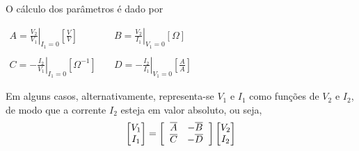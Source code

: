 \documentclass{article}
\numberwithin{equation}{section}
\begin{document}
\noindent O cálculo dos parâmetros é dado por
\begin{center}
    $\begin{matrix} %
            A=\displaystyle\left.\frac{V_{2}}{V_{1}}\right|_{I_{1}=0} \left[\frac{V}{V}\right] &\quad B=\displaystyle\left.\frac{V_{2}}{I_{1}}\right|_{V_{1}=0}[\Omega]\\\\
            C=\displaystyle\left.-\frac{I_{2}}{V_{1}}\right|_{I_{1}=0}[\Omega^{-1}]&\quad
            D=\displaystyle\left.-\frac{I_{2}}{I_{1}}\right|_{V_{1}=0}\left[\frac{A}{A}\right]
    \end{matrix}$
\end{center}

Em alguns casos, alternativamente, representa-se $V_{1}$ e $I_{1}$ como funções de $V_{2}$ e $I_{2}$, de modo que a corrente $I_{2}$ esteja em valor absoluto, ou seja,
\begin{equation*}
    \begin{bmatrix}
        V_{1} \\
        I_{1}
    \end{bmatrix}
    = %
    \begin{bmatrix}
        \hspace{0.2cm} \overline{A} & -\overline{B} \hspace{0.2cm} \\
        \hspace{0.2cm} \overline{C} & -\overline{D} \hspace{0.2cm}
    \end{bmatrix}
    \begin{bmatrix}
        V_{2} \\
        I_{2}
    \end{bmatrix}
\end{equation*}
\end{document}

